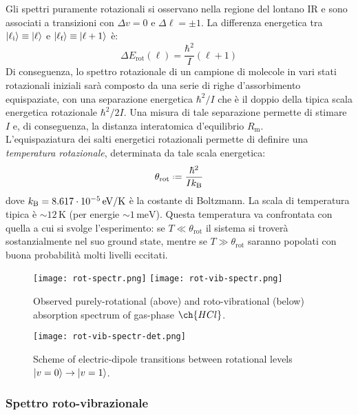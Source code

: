 Gli spettri puramente rotazionali si osservano nella regione del lontano IR e sono associati a transizioni con $ \Delta v = 0 $ e $ \Delta \ell = \pm 1 $. La differenza energetica tra $ \ket{\ell_\text{i}} \equiv \ket{\ell} $ e $ \ket{\ell_\text{f}} \equiv \ket{\ell + 1} $ è:
\begin{equation}
	\Delta E_\text{rot}(\ell) = \frac{\hbar^2}{I} (\ell + 1)
\end{equation}
Di conseguenza, lo spettro rotazionale di un campione di molecole in vari stati rotazionali iniziali sarà composto da una serie di righe d'assorbimento equispaziate, con una separazione energetica $ \hbar^2 / I $ che è il doppio della tipica scala energetica rotazionale $ \hbar^2 / 2I $. Una misura di tale separazione permette di stimare $ I $ e, di conseguenza, la distanza interatomica d'equilibrio $ R_\text{m} $. \\
L'equispaziatura dei salti energetici rotazionali permette di definire una \textit{temperatura rotazionale}, determinata da tale scala energetica:
\begin{equation}
	\theta_\text{rot} \defeq \frac{\hbar^2}{I k_\text{B}}
\end{equation}
dove $ k_\text{B} = 8.617 \cdot 10^{-5} \,\mathrm{eV}/\text{K} $ è la costante di Boltzmann. La scala di temperatura tipica è $ \sim 12 \,\text{K} $ (per energie $ \sim 1 \,\text{meV} $). Questa temperatura va confrontata con quella a cui si svolge l'esperimento: se $ T \ll \theta_\text{rot} $ il sistema si troverà sostanzialmente nel suo ground state, mentre se $ T \gg \theta_\text{rot} $ saranno popolati con buona probabilità molti livelli eccitati.

\begin{figure}
	\centering
	\texttt{[image: rot-spectr.png]}
	\texttt{[image: rot-vib-spectr.png]}
	\caption{Observed purely-rotational (above) and roto-vibrational (below) absorption spectrum of gas-phase $ \ch{HCl} $.}
	\label{rot-vib-sp}
\end{figure}
\begin{figure}
	\centering
	\texttt{[image: rot-vib-spectr-det.png]}
	\caption{Scheme of electric-dipole transitions between rotational levels $ \ket{v = 0} \rightarrow \ket{v = 1} $.}
	\label{rot-vib-det}
\end{figure}

\subsubsection{Spettro roto-vibrazionale}

